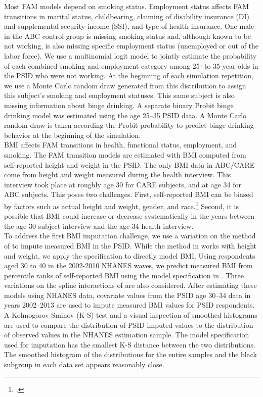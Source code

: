 \noindent Most FAM models depend on smoking status. Employment status affects FAM transitions in marital status, childbearing, claiming of disability insurance (DI) and supplemental security income (SSI), and type of health insurance.
One male in the ABC control group is missing smoking status and, although known to be not working, is also missing specific employment status (unemployed or out of the labor force).
 We use a multinomial logit model to jointly estimate the probability of each combined smoking and employment category among 25- to 35-year-olds in the PSID who were not working. At the beginning of each simulation repetition, we use a Monte Carlo random draw generated from this distribution to assign this subject's smoking and employment statuses. This same subject is also missing information about binge drinking.  A separate binary Probit binge drinking model was estimated using the age 25--35 PSID data. A Monte Carlo random draw is taken according the Probit probability to predict binge drinking behavior at the beginning of the simulation. \\
 
\noindent BMI affects FAM transitions in health, functional status, employment, and smoking.
The FAM transition models are estimated with BMI computed from self-reported height and weight in the PSID.
The only BMI data in ABC/CARE come from height and weight measured during the health interview. This interview took place at roughly age 30 for CARE subjects, and at age 34 for ABC subjects.
This poses two challenges.
First, self-reported BMI can be biased by factors such as actual height and weight, gender, and race.\footnote{\citet{Cawley_2004_JHR}.}
Second, it is possible that BMI could increase or decrease systematically in the years between the age-30 subject interview and the age-34 health interview. \\

\noindent To address the first BMI imputation challenge, we use a variation on the method of \citet*{Courtemanche_etal_2015_Adjusting-Body-Mass} to impute measured BMI in the PSID.
While the method in \citet{Courtemanche_etal_2015_Adjusting-Body-Mass} works with height and weight, we apply the specification to directly model BMI. Using respondents aged 30 to 40 in the 2002-2010 NHANES waves, we predict measured BMI from percentile ranks of self-reported BMI using the model specification in \citet{Courtemanche_etal_2015_Adjusting-Body-Mass}. Three variations 
on the spline interactions of \citet{Courtemanche_etal_2015_Adjusting-Body-Mass} are also considered.  After estimating these models using NHANES data, covariate values from the PSID 
age 30--34 data in years 2002--2013 are used to impute measured BMI values for PSID respondents. A Kolmogorov-Sminov (K-S) test and a visual inspection of smoothed histograms are used to compare the distribution of PSID imputed values to the distribution of observed values in the NHANES estimation sample.  The model specification used for imputation has the smallest K-S distance between the two distributions.  The smoothed histogram of the distributions for the entire samples and the black subgroup in each data set appears reasonably close.  \\

